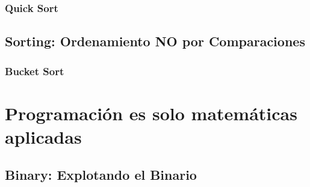 \documentclass[12pt, fleqn]{report}                             %
\theoremstyle{break}                                            %
\begin{document}
        \section{Quick Sort}



    \clearpage
    \chapter{Sorting: Ordenamiento NO por Comparaciones}
        
        \section{Bucket Sort}



\part{Programación es solo matemáticas aplicadas}

    \clearpage
    \chapter{Binary: Explotando el Binario}

\end{document}
